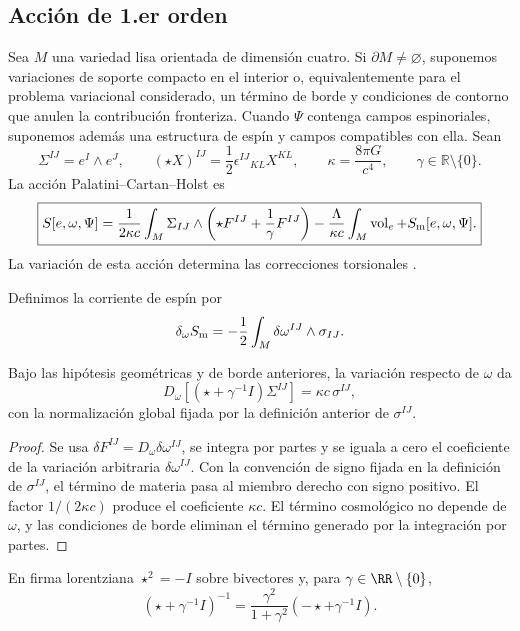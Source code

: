 \subsection{Acción de 1.er orden}

Sea \(M\) una variedad lisa orientada de dimensión cuatro. Si
\(\partial M\ne\varnothing\), suponemos variaciones de soporte compacto en el
interior o, equivalentemente para el problema variacional considerado, un
término de borde y condiciones de contorno que anulen la contribución
fronteriza. Cuando \(\Psi\) contenga campos espinoriales, suponemos además una
estructura de espín y campos compatibles con ella. Sean
\[
 \Sigma^{IJ}=e^I\wedge e^J,
 \qquad
 (\star X)^{IJ}=\frac12\epsilon^{IJ}{}_{KL}X^{KL},
 \qquad
 \kappa=\frac{8\pi G}{c^4},
 \qquad
 \gamma\in\mathbb R\setminus\{0\}.
\]
La acción Palatini--Cartan--Holst es
\[
\boxed{
 S[e,\omega,\Psi]
 =\frac1{2\kappa c}\int_M
 \Sigma_{IJ}\wedge\left(\star F^{IJ}+\frac1\gamma F^{IJ}\right)
 -\frac\Lambda{\kappa c}\int_M\operatorname{vol}_e
 +S_{\rm m}[e,\omega,\Psi].}
\]
La variación de esta acción determina las correcciones torsionales
\cite{Sciama1964,Kibble1961,Hehl1976,Holst1996}.

Definimos la corriente de espín por
\[
 \delta_\omega S_{\rm m}
 =-\frac12\int_M\delta\omega^{IJ}\wedge\sigma_{IJ}.
\]

\begin{theorem}
Bajo las hipótesis geométricas y de borde anteriores, la variación respecto
de \(\omega\) da
\[
 D_\omega\!\left[(\star+\gamma^{-1}I)\Sigma^{IJ}\right]
 =\kappa c\,\sigma^{IJ},
\]
con la normalización global fijada por la definición anterior de
\(\sigma^{IJ}\).
\end{theorem}
\begin{proof}
Se usa \(\delta F^{IJ}=D_\omega\delta\omega^{IJ}\), se integra por partes y
se iguala a cero el coeficiente de la variación arbitraria
\(\delta\omega^{IJ}\). Con la convención de signo fijada en la definición de
\(\sigma^{IJ}\), el término de materia pasa al miembro derecho con signo
positivo. El factor \(1/(2\kappa c)\) produce el coeficiente
\(\kappa c\). El término cosmológico no depende de \(\omega\), y las
condiciones de borde eliminan el término generado por la integración por
partes.
\end{proof}

En firma lorentziana \(\star^2=-I\) sobre bivectores y, para
\(\gamma\in\RR\setminus\{0\}\),
\[
 (\star+\gamma^{-1}I)^{-1}
 =\frac{\gamma^2}{1+\gamma^2}(-\star+\gamma^{-1}I).
\]

